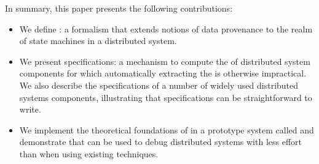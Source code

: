 In summary, this paper presents the following contributions:
\begin{itemize}
  \item
    We define \watprovenance{}: a formalism that extends notions of data
    provenance to the realm of state machines in a distributed system.
  \item
    We present \watprovenance{} specifications: a mechanism to compute the
    \watprovenance{} of distributed system components for which automatically
    extracting the \watprovenance{} is otherwise impractical.
    We also describe the \watprovenance{} specifications of a number of widely
    used distributed systems components, illustrating that \watprovenance{}
    specifications can be straightforward to write.
  \item
    We implement the theoretical foundations of \watprovenance{} in a prototype
    system called \fluent{} and demonstrate that \fluent{} can be used to debug
    distributed systems with less effort than when using existing techniques.
\end{itemize}
